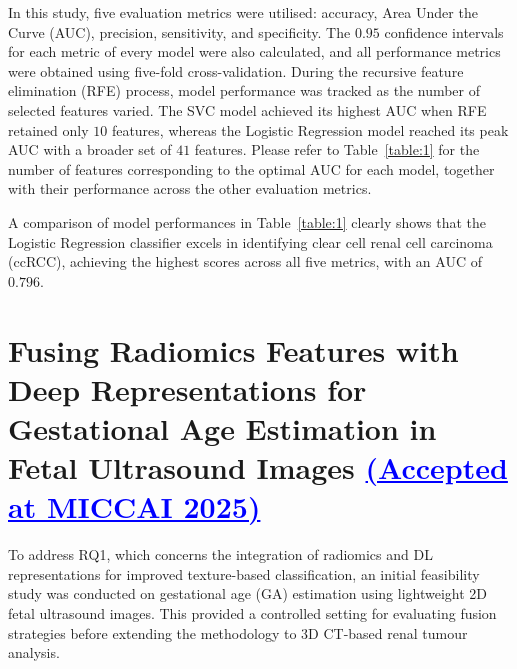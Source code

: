 \documentclass[final,british,a4paper,12pt]{phdthesis}
\begin{document}
In this study, five evaluation metrics were utilised: accuracy, Area Under the Curve (AUC), precision, sensitivity, and specificity. The $0.95$ confidence intervals for each metric of every model were also calculated, and all performance metrics were obtained using five-fold cross-validation. During the recursive feature elimination (RFE) process, model performance was tracked as the number of selected features varied. The SVC model achieved its highest AUC when RFE retained only $10$ features, whereas the Logistic Regression model reached its peak AUC with a broader set of $41$ features. Please refer to Table~\ref{table:1} for the number of features corresponding to the optimal AUC for each model, together with their performance across the other evaluation metrics.

A comparison of model performances in Table~\ref{table:1} clearly shows that the Logistic Regression classifier excels in identifying clear cell renal cell carcinoma (ccRCC), achieving the highest scores across all five metrics, with an AUC of $0.796$. 






\section{Fusing Radiomics Features with Deep Representations for Gestational Age Estimation in Fetal Ultrasound Images \textcolor{blue}{\uline{(Accepted at MICCAI 2025)}}}\label{Sec:fang}

To address RQ1, which concerns the integration of radiomics and DL representations for improved texture-based classification, an initial feasibility study was conducted on gestational age (GA) estimation using lightweight 2D fetal ultrasound images. This provided a controlled setting for evaluating fusion strategies before extending the methodology to 3D CT-based renal tumour analysis.
\end{document}
